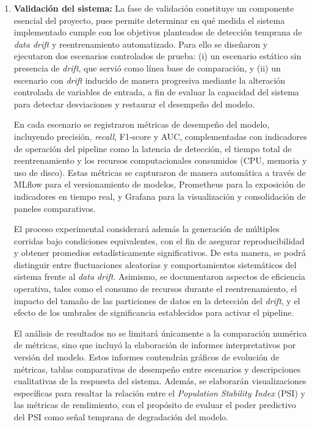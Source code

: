 \begin{enumerate}
    \item \textbf{Validación del sistema:} 
    La fase de validación constituye un componente esencial del proyecto, pues permite determinar en qué medida el sistema implementado cumple con los objetivos planteados de detección temprana de \textit{data drift} y reentrenamiento automatizado. Para ello se diseñaron y ejecutaron dos escenarios controlados de prueba: (i) un escenario estático sin presencia de \textit{drift}, que servió como línea base de comparación, y (ii) un escenario con \textit{drift} inducido de manera progresiva mediante la alteración controlada de variables de entrada, a fin de evaluar la capacidad del sistema para detectar desviaciones y restaurar el desempeño del modelo.
    
    En cada escenario se registraron métricas de desempeño del modelo, incluyendo precisión, \textit{recall}, F1-score y AUC, complementadas con indicadores de operación del pipeline como la latencia de detección, el tiempo total de reentrenamiento y los recursos computacionales consumidos (CPU, memoria y uso de disco). Estas métricas se capturaron de manera automática a través de MLflow para el versionamiento de modelos, Prometheus para la exposición de indicadores en tiempo real, y Grafana para la visualización y consolidación de paneles comparativos.
    
    El proceso experimental considerará además la generación de múltiples corridas bajo condiciones equivalentes, con el fin de asegurar reproducibilidad y obtener promedios estadísticamente significativos. De esta manera, se podrá distinguir entre fluctuaciones aleatorias y comportamientos sistemáticos del sistema frente al \textit{data drift}. Asimismo, se documentaron aspectos de eficiencia operativa, tales como el consumo de recursos durante el reentrenamiento, el impacto del tamaño de las particiones de datos en la detección del \textit{drift}, y el efecto de los umbrales de significancia establecidos para activar el pipeline.
    
    El análisis de resultados no se limitará únicamente a la comparación numérica de métricas, sino que incluyó la elaboración de informes interpretativos por versión del modelo. Estos informes contendrán gráficos de evolución de métricas, tablas comparativas de desempeño entre escenarios y descripciones cualitativas de la respuesta del sistema. Además, se elaborarán visualizaciones específicas para resaltar la relación entre el \textit{Population Stability Index} (PSI) y las métricas de rendimiento, con el propósito de evaluar el poder predictivo del PSI como señal temprana de degradación del modelo.
    

\end{enumerate}
